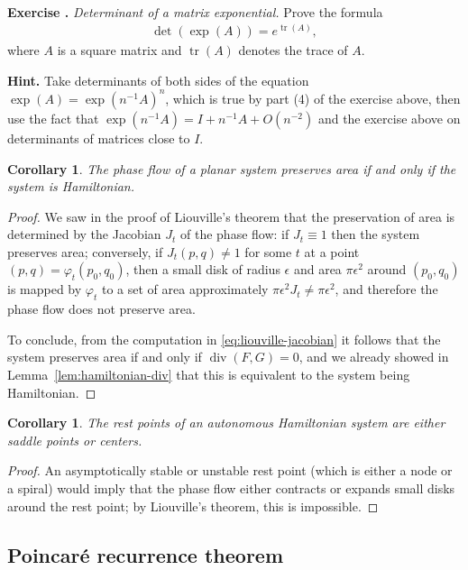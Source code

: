 \documentclass[12pt]{amsart}
\newcommand{\eqst}[1]{\begin{align*}#1\end{align*}}
\newcommand{\divr}{\operatorname{div}}
\newtheorem{cor}[thm]{Corollary}
\newcounter{exercise}
\newcommand{\beginexercise}[1]{\ \\ \addtocounter{exercise}{1} \textbf{Exercise \arabic{exercise}.} \textit{#1.}}
\begin{document}
\beginexercise{Determinant of a matrix exponential}
Prove the formula
\eqst{ \det\left( \exp(A)\right) = e^{\operatorname{tr}(A)}, }
where $A$ is a square matrix and $\operatorname{tr}(A)$ denotes the trace of $A$. 

\medskip \noindent \textbf{Hint.} 
Take determinants of both sides of the equation $\exp(A)=\exp(n^{-1} A)^n$, which is true by part (4) of the exercise above, then use the fact that $\exp(n^{-1} A)=I+n^{-1}A + O(n^{-2})$ and the exercise above on determinants of matrices close to $I$.

\begin{cor} The phase flow of a planar system preserves area if and only if the system is Hamiltonian.
\end{cor}

\begin{proof} We saw in the proof of Liouville's theorem that the preservation of area is determined by the Jacobian $J_t$ of the phase flow: if $J_t \equiv 1$ then the system preserves area; conversely, if $J_t(p,q)\neq 1$ for some $t$ at a point $(p,q)=\varphi_t(p_0,q_0)$, then a small disk of radius $\epsilon$ and area $\pi \epsilon^2$ around $(p_0,q_0)$ is mapped by $\varphi_t$ to a set of area approximately $\pi \epsilon^2 J_t \neq \pi \epsilon^2$, and therefore the phase flow does not preserve area.

To conclude, from the computation in \eqref{eq:liouville-jacobian} it follows that the system preserves area if and only if $\divr(F,G)=0$, and we already showed in Lemma~\ref{lem:hamiltonian-div} that this is equivalent to the system being Hamiltonian.
\end{proof}

\begin{cor} The rest points of an autonomous Hamiltonian system are either saddle points or centers.
\end{cor}

\begin{proof} An asymptotically stable or unstable rest point (which is either a node or a spiral) would imply that the phase flow either contracts or expands small disks around the rest point; by Liouville's theorem, this is impossible.
\end{proof}

\subsection{Poincar\'e recurrence theorem}
\end{document}
